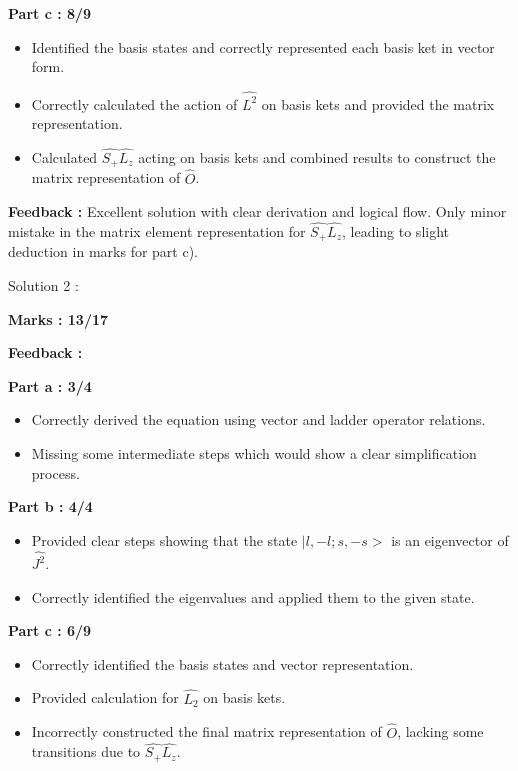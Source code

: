 \documentclass[a4paper,11pt]{article}
\begin{document}
\textbf{Part c : 8/9}

\begin{itemize}
    \item Identified the basis states and correctly represented each basis ket in vector form.
    \item Correctly calculated the action of $\hat{L^2}$ on basis kets and provided the matrix representation.
    \item Calculated $\hat{S_+}\hat{L_z}$ acting on basis kets and combined results to construct the matrix representation of $\hat{O}$.
\end{itemize}

\textbf{Feedback :}
Excellent solution with clear derivation and logical flow. Only minor mistake in the matrix element representation for $\hat{S_+}\hat{L_z}$, leading to slight deduction in marks for part c).



Solution 2 :

\textbf{Marks : 13/17}

\textbf{Feedback : }

\textbf{Part a : 3/4}

\begin{itemize}
    \item Correctly derived the equation using vector and ladder operator relations.
    \item Missing some intermediate steps which would show a clear simplification process.
\end{itemize}


\textbf{Part b : 4/4}

\begin{itemize}
    \item Provided clear steps showing that the state $|l, -l;s, -s>$ is an eigenvector of $\hat{J^2}$.
    \item Correctly identified the eigenvalues and applied them to the given state.
\end{itemize}


\textbf{Part c : 6/9}

\begin{itemize}
    \item Correctly identified the basis states and vector representation.
    \item Provided calculation for $\hat{L_2}$ on basis kets.
    \item Incorrectly constructed the final matrix representation of $\hat{O}$, lacking some transitions due to $\hat{S_+}\hat{L_z}$.
\end{itemize}
\end{document}
